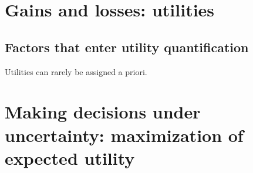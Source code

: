 \documentclass[
  a4paper,
  DIV=11,
  numbers=noendperiod,
  oneside]{scrreprt}
\begin{document}
\hypertarget{gains-and-losses-utilities}{%
\section{Gains and losses: utilities}\label{gains-and-losses-utilities}}

\hypertarget{factors-that-enter-utility-quantification}{%
\subsection{Factors that enter utility
quantification}\label{factors-that-enter-utility-quantification}}

Utilities can rarely be assigned a priori.

\hypertarget{making-decisions-under-uncertainty-maximization-of-expected-utility}{%
\section{Making decisions under uncertainty: maximization of expected
utility}\label{making-decisions-under-uncertainty-maximization-of-expected-utility}}
\end{document}
